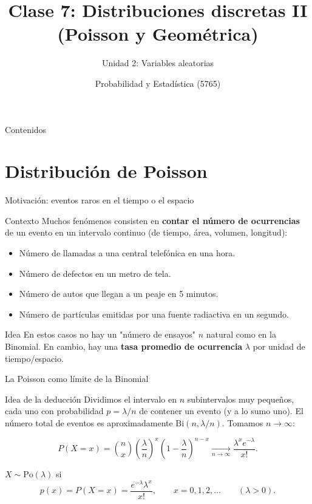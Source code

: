 \documentclass[aspectratio=169,11pt]{beamer}
\title[Prob. y Estadística]{Clase 7: Distribuciones discretas II (Poisson y Geométrica)}
\subtitle{Unidad 2: Variables aleatorias}
\institute[UNS]{Universidad Nacional del Sur \\ Departamento de Matemática}
\author{Probabilidad y Estadística (5765)}
\date{}
\begin{document}
\begin{frame}
\titlepage
\end{frame}

\begin{frame}{Contenidos}
\tableofcontents
\end{frame}

\section{Distribución de Poisson}

\begin{frame}{Motivación: eventos raros en el tiempo o el espacio}
\begin{block}{Contexto}
Muchos fenómenos consisten en \textbf{contar el número de ocurrencias} de un evento en un intervalo continuo (de tiempo, área, volumen, longitud):
\end{block}
\begin{example}
\begin{itemize}
\item Número de llamadas a una central telefónica en una hora.
\item Número de defectos en un metro de tela.
\item Número de autos que llegan a un peaje en 5 minutos.
\item Número de partículas emitidas por una fuente radiactiva en un segundo.
\end{itemize}
\end{example}
\begin{alertblock}{Idea}
En estos casos no hay un "número de ensayos" $n$ natural como en la Binomial. En cambio, hay una \textbf{tasa promedio de ocurrencia} $\lambda$ por unidad de tiempo/espacio.
\end{alertblock}
\end{frame}

\begin{frame}{La Poisson como límite de la Binomial}
\begin{block}{Idea de la deducción}
Dividimos el intervalo en $n$ subintervalos muy pequeños, cada uno con probabilidad $p=\lambda/n$ de contener un evento (y a lo sumo uno). El número total de eventos es aproximadamente $\text{Bi}(n, \lambda/n)$. Tomamos $n\to\infty$:
\end{block}
$$P(X=x) = \binom{n}{x}\left(\frac{\lambda}{n}\right)^x\left(1-\frac{\lambda}{n}\right)^{n-x} \xrightarrow[n\to\infty]{} \frac{\lambda^x e^{-\lambda}}{x!}.$$

\begin{definition}
$X\sim\text{Po}(\lambda)$ si
$$p(x) = P(X=x) = \frac{e^{-\lambda}\lambda^x}{x!}, \qquad x=0,1,2,\dots \qquad (\lambda>0).$$
\end{definition}
\end{frame}
\end{document}
